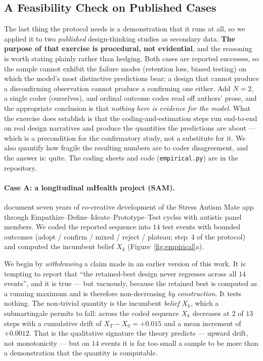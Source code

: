 \documentclass[11pt]{article}
\begin{document}
\subsection{A Feasibility Check on Published Cases}
\label{sec:cases}

The last thing the protocol needs is a demonstration that it runs at all, so we applied it to two \emph{published} design-thinking studies as secondary data. \textbf{The purpose of that exercise is procedural, not evidential}, and the reasoning is worth stating plainly rather than hedging. Both cases are reported successes, so the sample cannot exhibit the failure modes (retention loss, biased testing) on which the model's most distinctive predictions bear; a design that cannot produce a disconfirming observation cannot produce a confirming one either. Add $N=2$, a single coder (ourselves), and ordinal outcome codes read off authors' prose, and the appropriate conclusion is that \emph{nothing here is evidence for the model}. What the exercise does establish is that the coding-and-estimation steps run end-to-end on real design narratives and produce the quantities the predictions are about --- which is a precondition for the confirmatory study, not a substitute for it. We also quantify how fragile the resulting numbers are to coder disagreement, and the answer is: quite. The coding sheets and code (\texttt{empirical.py}) are in the repository.

\paragraph{Case A: a longitudinal mHealth project (SAM).} \citet{vanasselt2025} document seven years of co-creative development of the Stress Autism Mate app through Empathize--Define--Ideate--Prototype--Test cycles with autistic panel members. We coded the reported sequence into $14$ test events with bounded outcomes (adopt / confirm / mixed / reject / plateau; step~4 of the protocol) and computed the incumbent belief $X_k$ (Figure~\ref{fig:empirical}a).

We begin by \emph{withdrawing} a claim made in an earlier version of this work. It is tempting to report that ``the retained-best design never regresses across all $14$ events'', and it is true --- but vacuously, because the retained best is computed as a running maximum and is therefore non-decreasing \emph{by construction}. It tests nothing. The non-trivial quantity is the incumbent \emph{belief} $X_k$, which a submartingale permits to fall: across the coded sequence $X_k$ decreases at $2$ of $13$ steps with a cumulative drift of $X_T-X_0=+0.015$ and a mean increment of $+0.0012$. That is the qualitative signature the theory predicts --- upward drift, not monotonicity --- but on $14$ events it is far too small a sample to be more than a demonstration that the quantity is computable.
\end{document}
